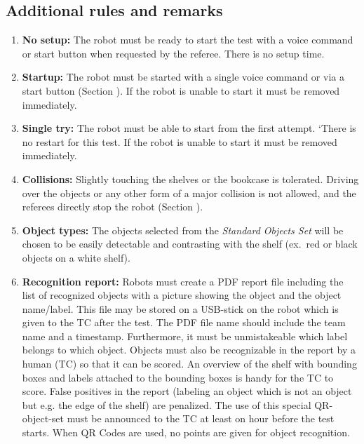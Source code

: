 \subsection{Additional rules and remarks}
\begin{enumerate}
\item \textbf{No setup:} The robot must be ready to start the test with a voice command or start button when requested by the referee. There is no setup time.
\item \textbf{Startup:} The robot must be started with a single voice command or via a start button (Section ). If the robot is unable to start it must be removed immediately.
\item \textbf{Single try:} The robot must be able to start from the first attempt. 
`There is no restart for this test. If the robot is unable to start it must be removed immediately.
\item \textbf{Collisions:} Slightly touching the shelves or the bookcase is tolerated. 
  Driving over the objects or any other form of a major collision is not allowed, and the referees directly stop the robot (Section ).
\item \textbf{Object types:} The objects selected from the \textit{Standard Objects Set} will be chosen to be easily detectable and contrasting with the shelf (ex.~red or black objects on a white shelf).
\item \textbf{Recognition report:} Robots must create a PDF report file including the list of recognized objects with a picture showing the object and the object name/label.
  This file may be stored on a USB-stick on the robot which is given to the TC after the test. The PDF file name should include the team name and a timestamp. 
  Furthermore, it must be unmistakeable which label belongs to which object. Objects must also be recognizable in the report by a human (TC) so that it can be scored. 
  An overview of the shelf with bounding boxes and labels attached to the bounding boxes is handy for the TC to score.
  False positives in the report (labeling an object which is not an object but e.g. the edge of the shelf) are penalized.
  The use of this special QR-object-set must be announced to the TC at least on hour before the test starts. When QR Codes are used, no points are given for object recognition.
\end{enumerate}

